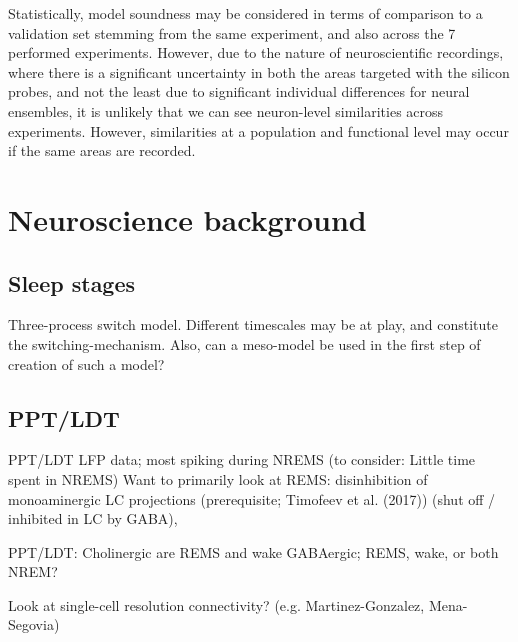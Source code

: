 \documentclass[mphil,deptreport,ai]{infthesis} %
\begin{document}
Statistically, model soundness may be considered in terms of comparison to a validation set stemming from the same experiment, and also across the 7 performed experiments. However, due to the nature of neuroscientific recordings, where there is a significant uncertainty in both the areas targeted with the silicon probes, and not the least due to significant individual differences for neural ensembles, it is unlikely that we can see neuron-level similarities across experiments. However, similarities at a population and functional level may occur if the same areas are recorded.



\section{Neuroscience background}

\subsection{Sleep stages}
Three-process switch model. Different timescales may be at play, and constitute the switching-mechanism.
Also, can a meso-model be used in the first step of creation of such a model?

\subsection{PPT/LDT}
PPT/LDT LFP data; most spiking during NREMS
(to consider: Little time spent in NREMS)
Want to primarily look at REMS: disinhibition of monoaminergic LC projections (prerequisite; Timofeev et al. (2017)) (shut off / inhibited in LC by GABA), 

PPT/LDT:
Cholinergic are REMS and wake
GABAergic; REMS, wake, or both
NREM?

Look at single-cell resolution connectivity? (e.g. Martinez-Gonzalez, Mena-Segovia)
\end{document}

